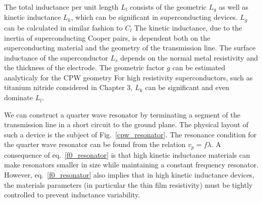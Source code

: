 The total inductance per unit length $L_l$ consists of the geometric $L_g$ as well as kinetic inductance $L_k$,
which can be significant in superconducting devices.
$L_g$ can be calculated in similar fashion to $C_l$ \cite{GaoThesis}
The kinetic inductance, due to the inertia of superconducting Cooper pairs, is dependent both on the superconducting material and the geometry of the transmission line.
The surface inductance of the superconductor $L_s$ depends on the normal metal resistivity and the thickness of the electrode. \cite{KherThesis}
The geometric factor $g$ can be estimated analyticaly for the CPW geometry \cite{RamiThesis, GaoThesis}
For high resistivity superconductors, such as titanium nitride considered in Chapter 3, $L_k$ can be significant and even dominate $L_l$.


We can construct a quarter wave resonator by terminating a segment of the transmission line in a short circuit to the ground plane.
The physical layout of such a device is the subject of Fig.~\ref{cpw_resonator}.
The resonance condition for the quarter wave resonator can be found from the relation $v_p = f \lambda$.
A consequence of eq.~\ref{f0_resonator} is that high kinetic inductance materials can make resonators smaller in size while maintaining a constant frequency resonator.
However, eq.~\ref{f0_resonator} also implies that in high kinetic inductance devices,
the materials parameters (in particular the thin film resistivity) must be tightly controlled to prevent inductance variability.

